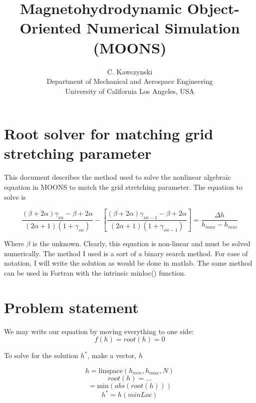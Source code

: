 \documentclass[11pt]{article}
\begin{document}
\doublespacing
\title{Magnetohydrodynamic Object-Oriented Numerical Simulation (MOONS)}
\author{C. Kawczynski \\
Department of Mechanical and Aerospace Engineering \\
University of California Los Angeles, USA\\
}
\maketitle

\section{Root solver for matching grid stretching parameter}

This document describes the method used to solve the nonlinear algebraic equation in MOONS to match the grid stretching parameter. The equation to solve is 

\begin{equation}
	\frac{(\beta+2\alpha)\gamma_{sn} - \beta + 2\alpha}{(2\alpha+1)(1+\gamma_{sn})}
	-
	\left[
	\frac{(\beta+2\alpha)\gamma_{sn-1} - \beta + 2\alpha}{(2\alpha+1)(1+\gamma_{sn-1})}
	\right]
	=
	\frac{\Delta h}{h_{max}-h_{min}}
\end{equation}

Where $\beta$ is the unknown. Clearly, this equation is non-linear and must be solved numerically. The method I used is a sort of a binary search method. For ease of notation, I will write the solution as would be done in matlab. The same method can be used in Fortran with the intrinsic minloc() function.

\section{Problem statement}
We may write our equation by moving everything to one side:
\begin{equation}
	f(h) = root(h) = 0
\end{equation}

To solve for the solution $h^*$, make a vector, $h$

\begin{equation}
	h = \text{linspace}(h_{min},h_{max},N)
\end{equation}
\begin{equation}
	root(h) = \ldots
\end{equation}
\begin{equation}
	[\text{minVal} \, \text{minLoc}] = \text{min}(abs(root(h)))
\end{equation}
\begin{equation}
	h^* = h(minLoc)
\end{equation}
\end{document}
